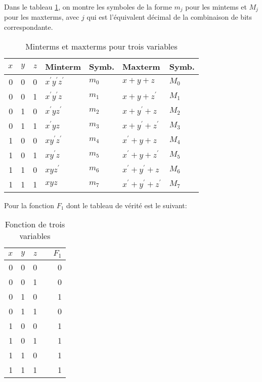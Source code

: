 \documentclass[11pt]{article}
\begin{document}
Dans le tableau \ref{tab:orgffba7a3}, on montre les symboles de la forme
\(m_j\) pour les mintems et \(M_j\) pour les maxterms, avec \(j\) qui
est l'équivalent décimal de la combinaison de bits correspondante.

\begin{table}[htbp]
\caption{\label{tab:orgffba7a3}Minterms et maxterms pour trois variables}
\centering
\begin{tabular}{rrrllll}
\(x\) & \(y\) & \(z\) & Minterm & Symb. & Maxterm & Symb.\\
\hline
0 & 0 & 0 & \(x^\prime y^\prime z^\prime\) & \(m_0\) & \(x+ y+ z\) & \(M_0\)\\
0 & 0 & 1 & \(x^\prime y^\prime z\) & \(m_1\) & \(x+ y+ z^\prime\) & \(M_1\)\\
0 & 1 & 0 & \(x^\prime y z^\prime\) & \(m_2\) & \(x+ y^\prime+ z\) & \(M_2\)\\
0 & 1 & 1 & \(x^\prime y z\) & \(m_3\) & \(x+ y^\prime+ z^\prime\) & \(M_3\)\\
1 & 0 & 0 & \(x y^\prime z^\prime\) & \(m_4\) & \(x^\prime+ y+ z\) & \(M_4\)\\
1 & 0 & 1 & \(x y^\prime z\) & \(m_5\) & \(x^\prime+ y+ z^\prime\) & \(M_5\)\\
1 & 1 & 0 & \(x y z^\prime\) & \(m_6\) & \(x^\prime+ y^\prime+ z\) & \(M_6\)\\
1 & 1 & 1 & \(x y z\) & \(m_7\) & \(x^\prime + y^\prime+ z^\prime\) & \(M_7\)\\
\end{tabular}
\end{table}

Pour la fonction \(F_1\) dont le tableau de vérité est le suivant: 

\begin{table}[htbp]
\caption{\label{tab:orgadf1be7}Fonction de trois variables}
\centering
\begin{tabular}{rrrlr}
\(x\) & \(y\) & \(z\) &  & \(F_1\)\\
\hline
0 & 0 & 0 &  & 0\\
0 & 0 & 1 &  & 0\\
0 & 1 & 0 &  & 1\\
0 & 1 & 1 &  & 0\\
1 & 0 & 0 &  & 1\\
1 & 0 & 1 &  & 1\\
1 & 1 & 0 &  & 1\\
1 & 1 & 1 &  & 1\\
\end{tabular}
\end{table}
\end{document}
